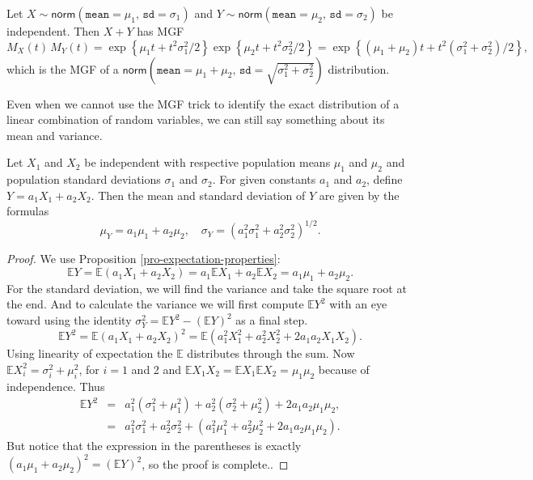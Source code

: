 \documentclass[captions=tableheading]{scrbook}
\begin{document}
\begin{example}
Let \(X\sim\mathsf{norm}(\mathtt{mean}=\mu_{1},\,\mathtt{sd}=\sigma_{1})\) and \(Y\sim\mathsf{norm}(\mathtt{mean}=\mu_{2},\,\mathtt{sd}=\sigma_{2})\) be independent. Then \(X+Y\) has MGF
\[
M_{X}(t)\, M_{Y}(t)=\exp\left\{ \mu_{1}t+t^{2}\sigma_{1}^{2}/2\right\} \exp\left\{ \mu_{2}t+t^{2}\sigma_{2}^{2}/2\right\} =\exp\left\{ \left(\mu_{1}+\mu_{2}\right)t+t^{2}\left(\sigma_{1}^{2}+\sigma_{2}^{2}\right)/2\right\} ,
\]
which is the MGF of a \(\mathsf{norm}\left(\mathtt{mean}=\mu_{1}+\mu_{2},\,\mathtt{sd}=\sqrt{\sigma_{1}^{2}+\sigma_{2}^{2}}\right)\) distribution. 
\end{example}

Even when we cannot use the MGF trick to identify the exact distribution of a linear combination of random variables, we can still say something about its mean and variance.

\begin{prop}
Let \(X_{1}\) and \(X_{2}\) be independent with respective population means \(\mu_{1}\) and \(\mu_{2}\) and population standard deviations \(\sigma_{1}\) and \(\sigma_{2}\). For given constants \(a_{1}\) and \(a_{2}\), define \(Y=a_{1}X_{1}+a_{2}X_{2}\). Then the mean and standard deviation of \(Y\) are given by the formulas
\begin{equation}
\mu_{Y}=a_{1}\mu_{1}+a_{2}\mu_{2},\quad\sigma_{Y}=\left(a_{1}^{2}\sigma_{1}^{2}+a_{2}^{2}\sigma_{2}^{2}\right)^{1/2}.
\end{equation}
\end{prop}

\begin{proof}
We use Proposition \ref{pro-expectation-properties}:
\[
\mathbb{E} Y=\mathbb{E}\left(a_{1}X_{1}+a_{2}X_{2}\right)=a_{1}\mathbb{E} X_{1}+a_{2}\mathbb{E} X_{2}=a_{1}\mu_{1}+a_{2}\mu_{2}.
\]
For the standard deviation, we will find the variance and take the square root at the end. And to calculate the variance we will first compute \(\mathbb{E} Y^{2}\) with an eye toward using the identity \(\sigma_{Y}^{2}=\mathbb{E} Y^{2}-\left(\mathbb{E} Y\right)^{2}\) as a final step. 
\[
\mathbb{E} Y^{2}=\mathbb{E}\left(a_{1}X_{1}+a_{2}X_{2}\right)^{2}=\mathbb{E}\left(a_{1}^{2}X_{1}^{2}+a_{2}^{2}X_{2}^{2}+2a_{1}a_{2}X_{1}X_{2}\right).
\]
Using linearity of expectation the \(\mathbb{E}\) distributes through the sum. Now \(\mathbb{E} X_{i}^{2}=\sigma_{i}^{2}+\mu_{i}^{2}\), for \(i=1\) and 2 and \(\mathbb{E} X_{1}X_{2}=\mathbb{E} X_{1}\mathbb{E} X_{2}=\mu_{1}\mu_{2}\) because of independence. Thus
\begin{eqnarray*}
\mathbb{E} Y^{2} & = & a_{1}^{2}(\sigma_{1}^{2}+\mu_{1}^{2})+a_{2}^{2}(\sigma_{2}^{2}+\mu_{2}^{2})+2a_{1}a_{2}\mu_{1}\mu_{2},\\
 & = & a_{1}^{2}\sigma_{1}^{2}+a_{2}^{2}\sigma_{2}^{2}+\left(a_{1}^{2}\mu_{1}^{2}+a_{2}^{2}\mu_{2}^{2}+2a_{1}a_{2}\mu_{1}\mu_{2}\right).
\end{eqnarray*}
But notice that the expression in the parentheses is exactly \(\left(a_{1}\mu_{1}+a_{2}\mu_{2}\right)^{2}=\left(\mathbb{E} Y\right)^{2}\), so the proof is complete.. 
\end{proof}
\end{document}
